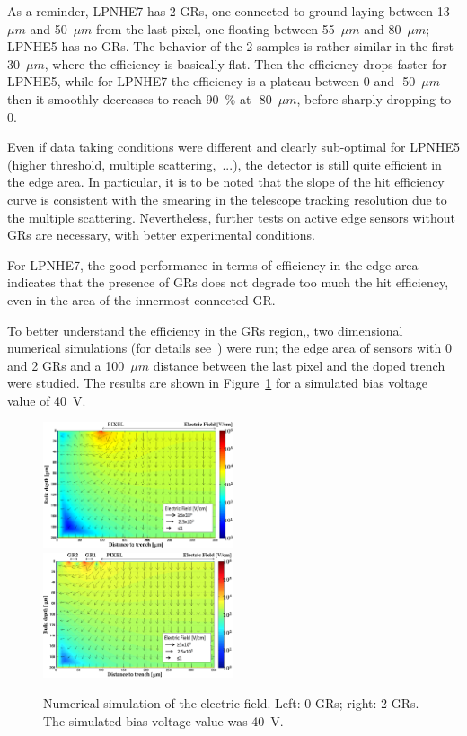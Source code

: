 As a reminder, LPNHE7 has 2 GRs, one connected to ground laying between 13~$\mu m$ and 50~$\mu m$ from the last pixel, one floating between 55~$\mu m$ and 80~$\mu m$; LPNHE5 has no GRs.
The behavior of the 2 samples is rather similar in the first 30~$\mu m$, where the efficiency is basically flat. Then the efficiency  drops faster  for LPNHE5, while  for LPNHE7 the efficiency is a plateau between 0 and -50~$\mu m$ then it smoothly decreases to reach 90~$\%$ at -80~$\mu m$, before sharply dropping to 0.

Even if data taking conditions were different and clearly sub-optimal for LPNHE5 (higher threshold, multiple scattering,~...), the detector is still quite efficient in the edge area. In particular, it is to be noted that the slope of the hit efficiency curve is consistent with the smearing in the telescope tracking resolution due to the multiple scattering. Nevertheless, further tests on active edge sensors without GRs are necessary, with better experimental conditions.

For LPNHE7, the good performance in terms of efficiency in the edge area indicates that the presence of GRs does not degrade too much the  hit efficiency, even in the area of the innermost connected GR.


To better understand the efficiency in the GRs region,, two dimensional numerical simulations (for details see~\cite{bib:nim2012}) were run; the edge area of  sensors with 0 and 2 GRs and
a 100~$\mu m$ distance between the last pixel
and the doped trench were studied. The results are shown in Figure~\ref{fig:EFtcad_edge} for a simulated bias voltage value of 40~V.

\begin{figure}[!htbp]
\centering
\includegraphics[width=0.497\textwidth,origin=c,angle=0]{smaller2GR_0.png}
\includegraphics[width=0.497\textwidth,origin=c,angle=0]{GR_2.png}
\caption{\label{fig:EFtcad_edge}Numerical simulation  of the electric field. Left: 0 GRs; right: 2 GRs. The simulated bias voltage value was 40~V.}
\end{figure}




